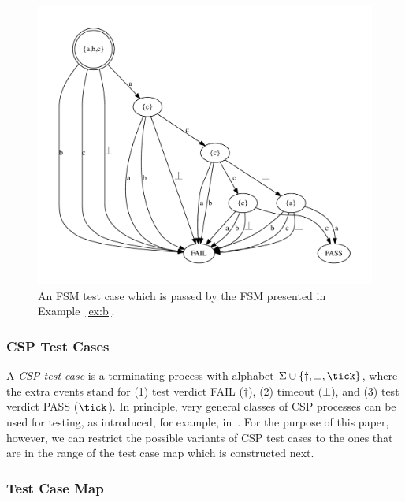  \begin{figure}
 \begin{center}
\includegraphics[width=.8\textwidth]{fsm0tc.pdf}
\end{center}
\caption{An FSM test case which is passed by the FSM presented in Example~\ref{ex:b}.}
 \label{fig:fsm0tc}
 \end{figure}

 


\subsubsection*{CSP Test Cases}
A \emph{CSP test case} is a terminating process with alphabet 
$\Sigma\cup\{\dag,\bot,\tick \}$, where the extra events stand for 
(1) test  verdict FAIL ($\dag$), (2) timeout ($\bot$), and (3) test 
 verdict PASS ($\tick$). In principle, very general classes of CSP processes can be
 used for testing, as introduced, for example, in~\cite{peleska_testing_1996,peleska1997a}. For the purpose of this paper, however, we can restrict the possible variants of CSP test cases to the ones that are in the range of the test case map which is constructed next.



\subsubsection*{Test Case Map}

